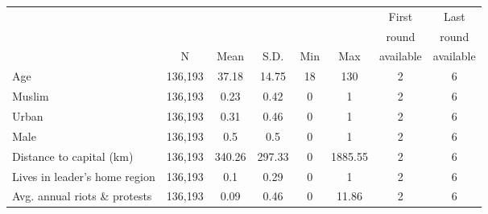  \begin{tabular}{l ccccccc} 
 &   &      &      &     &     & First     & Last     \\ 
  &   &      &      &     &     & round     & round    \\ 
  & N & Mean & S.D. & Min & Max & available & available \\ 
 \hline Age  &  136,193  &  37.18  &  14.75  &  18  &  130  &  2  &  6  \\ Muslim  &  136,193  &  0.23  &  0.42  &  0  &  1  &  2  &  6  \\ Urban  &  136,193  &  0.31  &  0.46  &  0  &  1  &  2  &  6  \\ Male  &  136,193  &  0.5  &  0.5  &  0  &  1  &  2  &  6  \\ Distance to capital (km)  &  136,193  &  340.26  &  297.33  &  0  &  1885.55  &  2  &  6  \\ Lives in leader's home region  &  136,193  &  0.1  &  0.29  &  0  &  1  &  2  &  6  \\ Avg. annual riots \& protests  &  136,193  &  0.09  &  0.46  &  0  &  11.86  &  2  &  6  \\ \hline  \end{tabular}